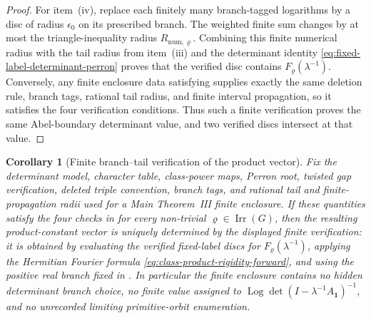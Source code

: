 \documentclass[11pt,a4paper]{amsart}
\theoremstyle{plain}
\newtheorem{corollary}[theorem]{Corollary}
\theoremstyle{definition}
\theoremstyle{remark}
\DeclareMathOperator{\Irr}{Irr}
\DeclareMathOperator{\Log}{Log}
\begin{document}
\begin{proof}
  For item~\textup{(iv)}, replace each finitely many branch-tagged logarithms
  by a disc of radius \(\epsilon_0\) on its prescribed branch.  The weighted
  finite sum changes by at most the triangle-inequality radius
  \(R_{\mathrm{num},\varrho}\).  Combining this finite numerical radius with
  the tail radius from item~\textup{(iii)} and the determinant identity
  \eqref{eq:fixed-label-determinant-perron} proves that the verified disc
  contains \(F_\varrho(\lambda^{-1})\).  Conversely, any finite enclosure data satisfying
   supplies exactly the same
  deletion rule, branch tags, rational tail radius, and finite interval
  propagation, so it satisfies the four verification conditions.  Thus such a
  finite verification proves the same Abel-boundary determinant value, and two
  verified discs intersect at that value.
\end{proof}

\begin{corollary}[Finite branch--tail verification of the product vector]
  \label{cor:main-iii-branch-tail-certificate-soundness}
  \label{cor:main-iii-branch-tail-enclosure}
  Fix the determinant model, character table, class-power maps, Perron root,
  twisted gap verification, deleted triple convention, branch tags, and rational
  tail and finite-propagation radii used for a Main Theorem~III finite
  enclosure.  If these quantities satisfy the four checks in
   for every non-trivial
  \(\varrho\in\Irr(G)\), then the resulting product-constant vector is uniquely
  determined by the displayed finite verification: it is obtained by evaluating the
  verified fixed-label discs for \(F_\varrho(\lambda^{-1})\), applying the
  Hermitian Fourier formula
  \eqref{eq:class-product-rigidity-forward}, and using the positive real branch
  fixed in .  In particular the
  finite enclosure contains no hidden determinant branch choice, no finite
  value assigned to \(\Log\det(I-\lambda^{-1}A_{\mathbf1})^{-1}\), and no
  unrecorded limiting primitive-orbit enumeration.
\end{corollary}
\end{document}

